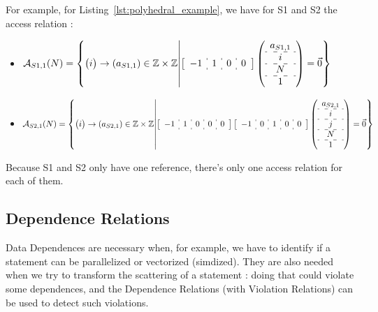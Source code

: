 \documentclass[paper=a4, fontsize=11.5pt]{scrartcl}
\numberwithin{equation}{section}        %
\numberwithin{figure}{section}          %
\numberwithin{table}{section}               %
\begin{document}
        For example, for Listing~\ref{lst:polyhedral_example}, we have for S1 and S2 the
        access relation :
        \begin{itemize}
            \item[]
                $
                \mathcal{A}_{S1,1}(N) = 
                \left\{
                \begin{pmatrix}i\end{pmatrix} \to \left(a_{S1,1}\right) \in \mathbb{Z}\times\mathbb{Z}
                    \middle|
                    \left[\begin{array}{c:c:c:c}-1 & 1 & 0 & 0 \end{array}\right]
                    \left(\begin{array}{c}a_{S1,1}\\\hdashline i\\\hdashline N\\\hdashline 1\end{array}\right)
                    = \vec{0}
                \right\}
                $
            
            \item[]
                $
                \mathcal{A}_{S2,1}(N) = 
                \left\{
                \begin{pmatrix}i\end{pmatrix} \to \left(a_{S2,1}\right) \in \mathbb{Z}\times\mathbb{Z}
                    \middle|
                    \left[\begin{array}{c:c:c:c:c}-1 & 1 & 0 & 0 & 0 \end{array}\right]
                    \left[\begin{array}{c:c:c:c:c}-1 & 0 & 1 & 0 & 0 \end{array}\right]
                    \left(\begin{array}{c}a_{S2,1}\\\hdashline i\\\hdashline j\\\hdashline N\\\hdashline 1\end{array}\right)
                    = \vec{0}
                \right\}
                $
        \end{itemize}

        Because S1 and S2 only have one reference, there's only one access relation for
        each of them.

    \subsection{Dependence Relations}
    \label{sec:dependence_relations}
        Data Dependences are necessary when, for example, we have to identify if a statement
        can be parallelized or vectorized (simdized). They are also needed when we try to
        transform the scattering of a statement : doing that could violate some dependences,
        and the Dependence Relations (with Violation Relations) can be used to detect such
        violations.
\end{document}
